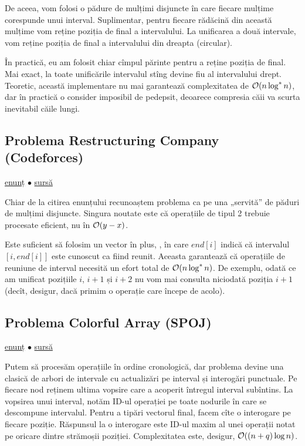 \documentclass[../main.tex]{subfiles}
\begin{document}
De aceea, vom folosi o pădure de mulțimi disjuncte în care fiecare mulțime corespunde unui interval. Suplimentar, pentru fiecare rădăcină din această mulțime vom reține poziția de final a intervalului. La unificarea a două intervale, vom reține poziția de final a intervalului din dreapta (circular).

În practică, eu am folosit chiar cîmpul părinte pentru a reține poziția de final. Mai exact, la toate unificările intervalul stîng devine fiu al intervalului drept. Teoretic, această implementare nu mai garantează complexitatea de $\mathcal{O}(n \log^{*} n)$, dar în practică o consider imposibil de pedepsit, deoarece compresia căii va scurta inevitabil căile lungi.

\subsection{Problema Restructuring Company (Codeforces)}
\label{problem:restructuring-company}

\href{https://codeforces.com/contest/566/problem/D}{enunț}
$\bullet$
\hyperref[code:restructuring-company]{sursă}

Chiar de la citirea enunțului recunoaștem problema ca pe una „servită” de păduri de mulțimi disjuncte. Singura noutate este că operațiile de tipul 2 trebuie procesate eficient, nu în $\mathcal{O}(y - x)$.

Este suficient să folosim un vector în plus, , în care $end[i]$ indică că intervalul $[i, end[i]]$ este cunoscut ca fiind reunit. Aceasta garantează că operațiile de reuniune de interval necesită un efort total de $\mathcal{O}(n \log^{*} n)$. De exemplu, odată ce am unificat pozițiile $i$, $i + 1$ și $i + 2$ nu vom mai consulta niciodată poziția $i + 1$ (decît, desigur, dacă primim o operație care începe de acolo).


\subsection{Problema Colorful Array (SPOJ)}
\label{problem:colorful-array}

\href{https://www.spoj.com/problems/CLFLARR/}{enunț}
$\bullet$
\hyperref[code:colorful-array]{sursă}

Putem să procesăm operațiile în ordine cronologică, dar problema devine una clasică de arbori de intervale cu actualizări pe interval și interogări punctuale. Pe fiecare nod reținem ultima vopsire care a acoperit întregul interval subîntins. La vopsirea unui interval, notăm ID-ul operației pe toate nodurile în care se descompune intervalul. Pentru a tipări vectorul final, facem cîte o interogare pe fiecare poziție. Răspunsul la o interogare este ID-ul maxim al unei operații notat pe oricare dintre strămoșii poziției. Complexitatea este, desigur, $\mathcal{O}((n + q) \log n)$.
\end{document}
